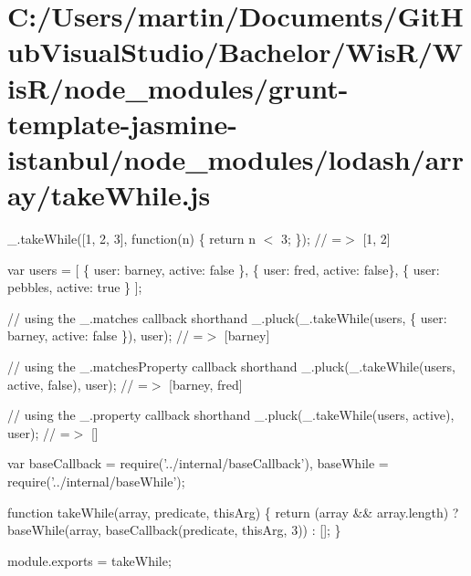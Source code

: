 \hypertarget{_c_1_2_users_2martin_2_documents_2_git_hub_visual_studio_2_bachelor_2_wis_r_2_wis_r_2node_modulefcda543557406226c9c41a26d0ec7d8c}{}\section{C\+:/\+Users/martin/\+Documents/\+Git\+Hub\+Visual\+Studio/\+Bachelor/\+Wis\+R/\+Wis\+R/node\+\_\+modules/grunt-\/template-\/jasmine-\/istanbul/node\+\_\+modules/lodash/array/take\+While.\+js}
\+\_\+.\+take\+While(\mbox{[}1, 2, 3\mbox{]}, function(n) \{ return n $<$ 3; \}); // =$>$ \mbox{[}1, 2\mbox{]}

var users = \mbox{[} \{ \textquotesingle{}user\textquotesingle{}\+: \textquotesingle{}barney\textquotesingle{}, \textquotesingle{}active\textquotesingle{}\+: false \}, \{ \textquotesingle{}user\textquotesingle{}\+: \textquotesingle{}fred\textquotesingle{}, \textquotesingle{}active\textquotesingle{}\+: false\}, \{ \textquotesingle{}user\textquotesingle{}\+: \textquotesingle{}pebbles\textquotesingle{}, \textquotesingle{}active\textquotesingle{}\+: true \} \mbox{]};

// using the {\ttfamily \+\_\+.\+matches} callback shorthand \+\_\+.\+pluck(\+\_\+.\+take\+While(users, \{ \textquotesingle{}user\textquotesingle{}\+: \textquotesingle{}barney\textquotesingle{}, \textquotesingle{}active\textquotesingle{}\+: false \}), \textquotesingle{}user\textquotesingle{}); // =$>$ \mbox{[}\textquotesingle{}barney\textquotesingle{}\mbox{]}

// using the {\ttfamily \+\_\+.\+matches\+Property} callback shorthand \+\_\+.\+pluck(\+\_\+.\+take\+While(users, \textquotesingle{}active\textquotesingle{}, false), \textquotesingle{}user\textquotesingle{}); // =$>$ \mbox{[}\textquotesingle{}barney\textquotesingle{}, \textquotesingle{}fred\textquotesingle{}\mbox{]}

// using the {\ttfamily \+\_\+.\+property} callback shorthand \+\_\+.\+pluck(\+\_\+.\+take\+While(users, \textquotesingle{}active\textquotesingle{}), \textquotesingle{}user\textquotesingle{}); // =$>$ \mbox{[}\mbox{]}


\begin{DoxyCodeInclude}
var baseCallback = require(\textcolor{stringliteral}{'../internal/baseCallback'}),
    baseWhile = require(\textcolor{stringliteral}{'../internal/baseWhile'});

\textcolor{keyword}{function} takeWhile(array, predicate, thisArg) \{
  \textcolor{keywordflow}{return} (array && array.length)
    ? baseWhile(array, baseCallback(predicate, thisArg, 3))
    : [];
\}

module.exports = takeWhile;
\end{DoxyCodeInclude}
 